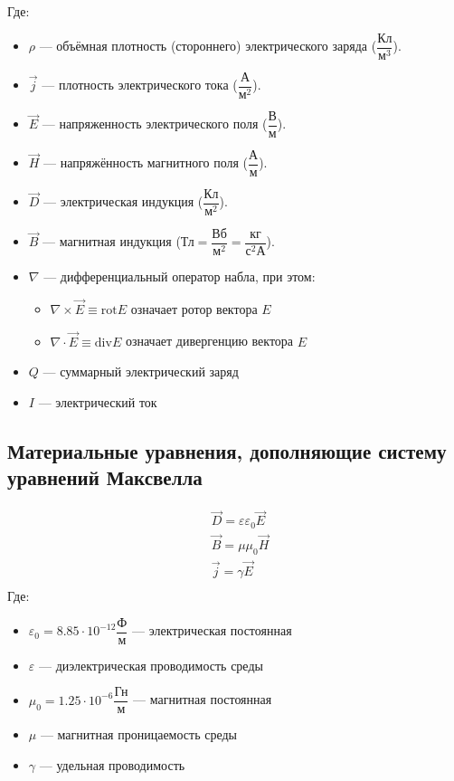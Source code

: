 \documentclass[12pt]{report}
\begin{document}
Где:
\begin{itemize}
    \item $\rho$ --- объёмная плотность (стороннего) электрического заряда ($\dfrac{\text{Кл}}{\text{м}^3}$).
    \item $\vec j$ --- плотность электрического тока ($\dfrac{\text{А}}{\text{м}^2}$).
    \item $\vec E$ --- напряженность электрического поля ($\dfrac{\text{В}}{\text{м}}$).
    \item $\vec H$ --- напряжённость магнитного поля ($\dfrac{\text{А}}{\text{м}}$).
    \item $\vec D$ --- электрическая индукция ($\dfrac{\text{Кл}}{\text{м}^2}$).
    \item $\vec B$ --- магнитная индукция ($\text{Тл} = \dfrac{\text{Вб}}{\text{м}^2} = \dfrac{\text{кг}}{\text{с}^2\text{А}}$).
    \item $\nabla$ --- дифференциальный оператор набла, при этом:
          \begin{itemize}
              \item $\nabla \times \vec E \equiv \text{rot} E$ означает ротор вектора $E$
              \item $\nabla \cdot \vec E \equiv \text{div} E$ означает дивергенцию вектора $E$
          \end{itemize}
    \item $Q$ --- суммарный электрический заряд
    \item $I$ --- электрический ток
\end{itemize}

\subsection{Материальные уравнения, дополняющие систему уравнений Максвелла}
\begin{align*}
     & \vec D = \varepsilon \varepsilon_0 \vec E \\
     & \vec B = \mu \mu_0 \vec H                 \\
     & \vec j = \gamma \vec E                    \\
\end{align*}
Где:
\begin{itemize}
    \item $\varepsilon_0 = 8.85 \cdot 10^{-12} \dfrac{\text{Ф}}{\text{м}}$ --- электрическая постоянная
    \item $\varepsilon$ --- диэлектрическая проводимость среды
    \item $\mu_0 = 1.25 \cdot 10^{-6} \dfrac{\text{Гн}}{\text{м}}$ --- магнитная постоянная
    \item $\mu$ --- магнитная проницаемость среды
    \item $\gamma$ --- удельная проводимость
\end{itemize}
\end{document}
